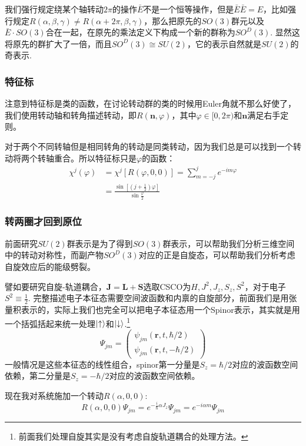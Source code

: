 我们强行规定绕某个轴转动$2\pi$的操作$\bar{E}$不是一个恒等操作，但是$\bar{E}\bar{E}=E$，比如强行规定$R(\alpha,\beta,\gamma)\neq R(\alpha+2\pi,\beta,\gamma)$，那么把原先的$SO(3)$群元以及$\bar E\cdot SO(3)$合在一起，在原先的乘法定义下构成一个新的群称为$SO^D(3)$. 显然这将原先的群扩大了一倍，而且$SO^D(3)\cong SU(2)$，它的表示自然就是$SU(2)$的奇表示.
\subsubsection*{特征标}
注意到特征标是类的函数，在讨论转动群的类的时候用Euler角就不那么好使了，我们使用转动轴和转角描述转动，即$R(\mathbf{n},\varphi)$，其中$\varphi\in [0,2\pi)$和$\mathbf{n}$满足右手定则。

对于两个不同转轴但是相同转角的转动是同类转动，因为我们总是可以找到一个转动将两个转轴重合。所以特征标只是$\varphi$的函数：
\begin{equation}
	\begin{aligned}
	\chi^j(\varphi)&=\chi^j\left[R(\varphi,0,0)\right]=\sum_{m=-j}^je^{-im\varphi}\\
	&=\boxed{\frac{\sin\left[\left(j+\frac{1}{2}\right)\varphi\right]}{\sin\frac{\varphi}{2}}}
	\end{aligned}
\end{equation}

\subsubsection*{转两圈才回到原位}
前面研究$SU(2)$群表示是为了得到$SO(3)$群表示，可以帮助我们分析三维空间中的转动对称性，而副产物$SO^D(3)$对应的正是自旋态，可以帮助我们分析考虑自旋效应后的能级劈裂。

譬如要研究自旋-轨道耦合，$\mathbf{J}=\mathbf{L}+\mathbf{S}$选取CSCO为$H,J^2,J_z,S_z,S^2$，对于电子$S^2\equiv\frac{1}{2}$. 完整描述电子本征态需要空间波函数和内禀的自旋部分，前面我们是用张量积表示的，实际上我们也完全可以把电子本征态用一个Spinor表示，其实就是用一个括弧括起来统一处理$\ket{\uparrow}$和$\ket{\downarrow}$.\footnote{前面我们处理自旋其实是没有考虑自旋轨道耦合的处理方法。}
\[\Psi_{jm}=\begin{pmatrix}
	\psi_{jm}(\mathbf{r},t,\hbar/2)\\
	\psi_{jm}(\mathbf{r},t,-\hbar/2)
\end{pmatrix}\]
一般情况是这些本征态的线性组合，spinor第一分量是$S_z=\hbar/2$对应的波函数空间依赖，第二分量是$S_z=-\hbar/2$对应的波函数空间依赖。

现在我对系统施加一个转动$R(\alpha,0,0)$:
\[R(\alpha,0,0)\Psi_{jm}=e^{-\frac{i}{\hbar}\alpha J_z}\Psi_{jm}=e^{-i\alpha m}\Psi_{jm}\]


